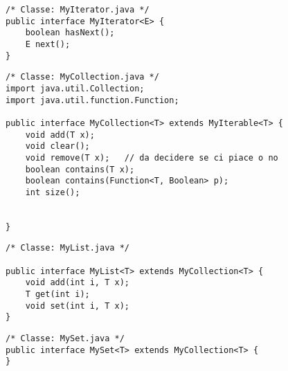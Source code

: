 \begin{lstlisting}[basicstyle=\small,]
/* Classe: MyIterator.java */
public interface MyIterator<E> {
    boolean hasNext();
    E next();
}
\end{lstlisting}

\begin{lstlisting}[basicstyle=\small,]
/* Classe: MyCollection.java */
import java.util.Collection;
import java.util.function.Function;

public interface MyCollection<T> extends MyIterable<T> {
    void add(T x);
    void clear();
    void remove(T x);   // da decidere se ci piace o no
    boolean contains(T x);
    boolean contains(Function<T, Boolean> p);
    int size();


}
\end{lstlisting}

\begin{lstlisting}[basicstyle=\small,]
/* Classe: MyList.java */

public interface MyList<T> extends MyCollection<T> {
    void add(int i, T x);
    T get(int i);
    void set(int i, T x);
}
\end{lstlisting}

\begin{lstlisting}[basicstyle=\small,]
/* Classe: MySet.java */
public interface MySet<T> extends MyCollection<T> {
}
\end{lstlisting}

